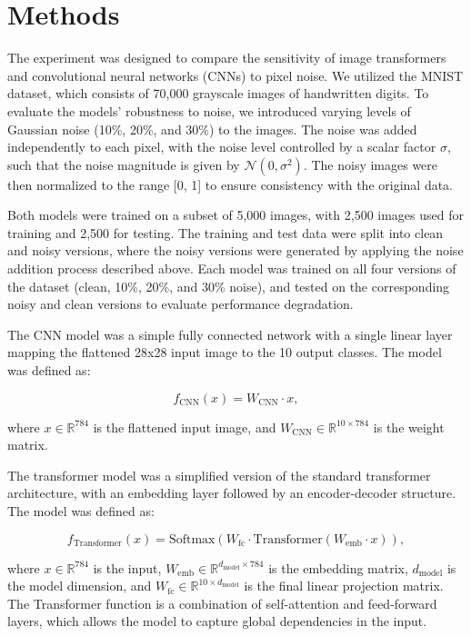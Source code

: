 \documentclass{article}
\begin{document}
\section*{Methods}

The experiment was designed to compare the sensitivity of image transformers and convolutional neural networks (CNNs) to pixel noise. We utilized the MNIST dataset, which consists of 70,000 grayscale images of handwritten digits. To evaluate the models' robustness to noise, we introduced varying levels of Gaussian noise (10\%, 20\%, and 30\%) to the images. The noise was added independently to each pixel, with the noise level controlled by a scalar factor $\sigma$, such that the noise magnitude is given by $ \mathcal{N}(0, \sigma^2) $. The noisy images were then normalized to the range [0, 1] to ensure consistency with the original data.

Both models were trained on a subset of 5,000 images, with 2,500 images used for training and 2,500 for testing. The training and test data were split into clean and noisy versions, where the noisy versions were generated by applying the noise addition process described above. Each model was trained on all four versions of the dataset (clean, 10\%, 20\%, and 30\% noise), and tested on the corresponding noisy and clean versions to evaluate performance degradation.

The CNN model was a simple fully connected network with a single linear layer mapping the flattened 28x28 input image to the 10 output classes. The model was defined as:

$$
f_{\text{CNN}}(x) = W_{\text{CNN}} \cdot x,
$$

where $ x \in \mathbb{R}^{784} $ is the flattened input image, and $ W_{\text{CNN}} \in \mathbb{R}^{10 \times 784} $ is the weight matrix.

The transformer model was a simplified version of the standard transformer architecture, with an embedding layer followed by an encoder-decoder structure. The model was defined as:

$$
f_{\text{Transformer}}(x) = \text{Softmax}(W_{\text{fc}} \cdot \text{Transformer}(W_{\text{emb}} \cdot x)),
$$

where $ x \in \mathbb{R}^{784} $ is the input, $ W_{\text{emb}} \in \mathbb{R}^{d_{\text{model}} \times 784} $ is the embedding matrix, $ d_{\text{model}} $ is the model dimension, and $ W_{\text{fc}} \in \mathbb{R}^{10 \times d_{\text{model}}} $ is the final linear projection matrix. The Transformer function is a combination of self-attention and feed-forward layers, which allows the model to capture global dependencies in the input.
\end{document}
